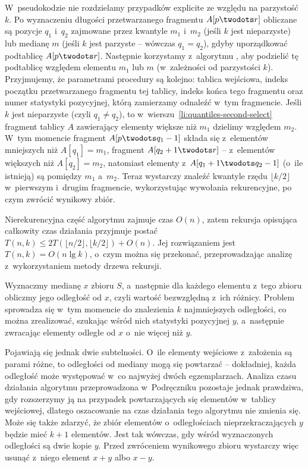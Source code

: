 W~pseudokodzie nie rozdzielamy przypadków explicite ze względu na parzystość $k$.
Po wyznaczeniu długości przetwarzanego fragmentu $A[p\twodots r]$ obliczane są pozycje $q_1$ i~$q_2$ zajmowane przez kwantyle $m_1$ i~$m_2$ (jeśli $k$ jest nieparzyste) lub medianę $m$ (jeśli $k$ jest parzyste -- wówczas $q_1=q_2$), gdyby uporządkować podtablicę $A[p\twodots r]$.
Następnie korzystamy z~algorytmu , aby podzielić tę podtablicę względem elementu $m_1$ lub $m$ (w~zależności od parzystości $k$).
Przyjmujemy, że parametrami procedury  są kolejno: tablica wejściowa, indeks początku przetwarzanego fragmentu tej tablicy, indeks końca tego fragmentu oraz numer statystyki pozycyjnej, którą zamierzamy odnaleźć w~tym fragmencie.
Jeśli $k$ jest nieparzyste (czyli $q_1\ne q_2$), to w~wierszu~\ref{li:quantiles-second-select} fragment tablicy $A$ zawierający elementy większe niż $m_1$ dzielimy względem $m_2$.
W~tym momencie fragment $A[p\twodots q_1-1]$ składa się z~elementów mniejszych niż $A[q_1]=m_1$, fragment $A[q_2+1\twodots r]$ -- z~elementów większych niż $A[q_2]=m_2$, natomiast elementy z~$A[q_1+1\twodots q_2-1]$ (o~ile istnieją) są pomiędzy $m_1$ a~$m_2$.
Teraz wystarczy znaleźć kwantyle rzędu $\lfloor k/2\rfloor$ w~pierwszym i~drugim fragmencie, wykorzystując wywołania rekurencyjne, po czym zwrócić wynikowy zbiór.

Nierekurencyjna część algorytmu zajmuje czas $O(n)$, zatem rekursja opisująca całkowity czas działania przyjmuje postać $T(n,k)\le2T(\lfloor n/2\rfloor,\lfloor k/2\rfloor)+O(n)$.
Jej rozwiązaniem jest $T(n,k)=O(n\lg k)$, o~czym można się przekonać, przeprowadzając analizę z~wykorzystaniem metody drzewa rekursji.

\exercise %
Wyznaczmy medianę $x$ zbioru $S$, a~następnie dla każdego elementu z~tego zbioru obliczmy jego odległość od $x$, czyli wartość bezwzględną z~ich różnicy.
Problem sprowadza się w~tym momencie do znalezienia $k$ najmniejszych odległości, co można zrealizować, szukając wśród nich  statystyki pozycyjnej $y$, a~następnie zwracając elementy odległe od $x$ o~nie więcej niż $y$.

Pojawiają się jednak dwie subtelności.
O~ile elementy wejściowe z~założenia są parami różne, to odległości od mediany mogą się powtarzać -- dokładniej, każda odległość może występować w~co najwyżej dwóch egzemplarzach.
Analiza czasu działania algorytmu  przeprowadzona w~Podręczniku pozostaje jednak prawdziwa, gdy rozszerzymy ją na przypadek powtarzających się elementów w~tablicy wejściowej, dlatego oszacowanie na czas działania tego algorytmu nie zmienia się.
Może się także zdarzyć, że zbiór elementów o~odległościach nieprzekraczających $y$ będzie mieć $k+1$ elementów.
Jest tak wówczas, gdy wśród wyznaczonych odległości są dwie kopie $y$.
Przed zwróceniem wynikowego zbioru wystarczy więc usunąć z~niego element $x+y$ albo $x-y$.

